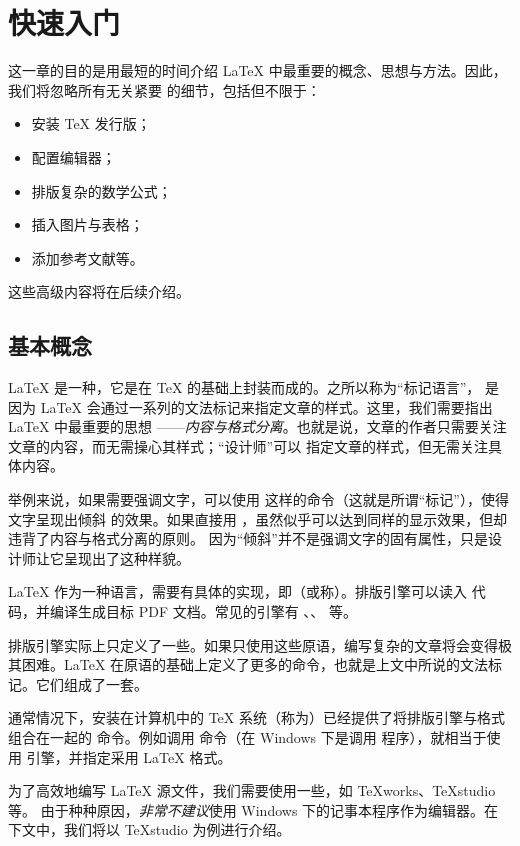 \chapter{快速入门}

这一章的目的是用最短的时间介绍 \LaTeX{} 中最重要的概念、思想与方法。因此，我们将忽略所有无关紧要
的细节，包括但不限于：

\begin{itemize}
  \item 安装 \TeX{} 发行版；
  \item 配置编辑器；
  \item 排版复杂的数学公式；
  \item 插入图片与表格；
  \item 添加参考文献等。
\end{itemize}

这些高级内容将在后续介绍。

\section{基本概念}

\LaTeX{} 是一种，它是在 \TeX{} 的基础上封装而成的。之所以称为“标记语言”，
是因为 \LaTeX{} 会通过一系列的文法标记来指定文章的样式。这里，我们需要指出 \LaTeX{} 中最重要的思想
——\emph{内容与格式分离}。也就是说，文章的作者只需要关注文章的内容，而无需操心其样式；“设计师”可以
指定文章的样式，但无需关注具体内容。

举例来说，如果需要强调文字，可以使用  这样的命令（这就是所谓“标记”），使得文字呈现出倾斜
的效果。如果直接用 ，虽然似乎可以达到同样的显示效果，但却违背了内容与格式分离的原则。
因为“倾斜”并不是强调文字的固有属性，只是设计师让它呈现出了这种样貌。

\LaTeX{} 作为一种语言，需要有具体的实现，即（或称）。排版引擎可以读入
代码，并编译生成目标 PDF 文档。常见的引擎有 \pdfTeX{}、\XeTeX{}、\LuaTeX{} 等。

排版引擎实际上只定义了一些。如果只使用这些原语，编写复杂的文章将会变得极其困难。\LaTeX{}
在原语的基础上定义了更多的命令，也就是上文中所说的文法标记。它们组成了一套。

通常情况下，安装在计算机中的 \TeX{} 系统（称为）已经提供了将排版引擎与格式组合在一起的
命令。例如调用  命令（在 Windows 下是调用  程序），就相当于使用
\XeTeX{} 引擎，并指定采用 \LaTeX{} 格式。

为了高效地编写 \LaTeX{} 源文件，我们需要使用一些，如 TeXworks、TeXstudio 等。
由于种种原因，\emph{非常不建议}使用 Windows 下的记事本程序作为编辑器。在下文中，我们将以 TeXstudio
为例进行介绍。

